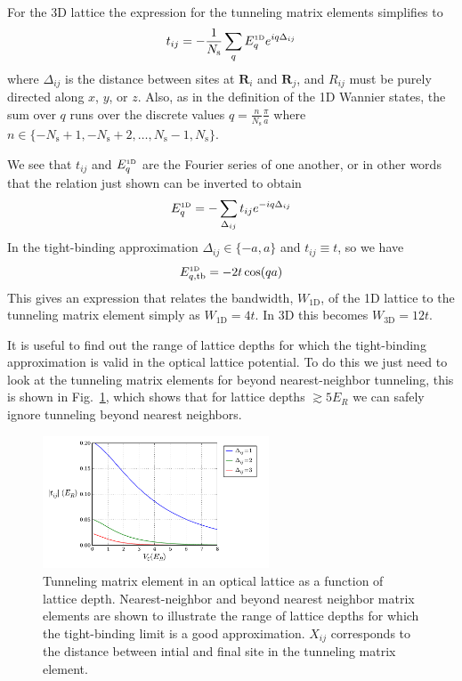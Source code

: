\documentclass[11pt,letter]{article}
\newcommand{\bv}[1]{\ensuremath{\bm{#1}}}
\begin{document}
For the 3D lattice the expression for the tunneling matrix elements simplifies to 
\begin{equation}
  t_{ij} = -\frac{1}{N_{\mathrm{s}}} \sum_{q} E_{q}^{\text{\tiny 1D}} e^{iq \Delta_{ij}} 
\end{equation}
where $\Delta_{ij}$ is the distance between sites at $\bv{R}_{i}$ and $\bv{R}_{j}$, and $R_{ij}$ must be purely directed along $x$, $y$, or $z$.  Also, as in the definition of the 1D Wannier states, the sum over $q$ runs over the discrete
values $q = \frac{n}{N_{\mathrm{s}}} \frac{\pi}{a}$ where 
$ n \in \lbrace
-N_{\mathrm{s}}+1, -N_{\mathrm{s}}+2, \ldots, N_{\mathrm{s}}-1,  N_{\mathrm{s}}  \rbrace$.

We see that $t_{ij}$ and $E_{q}^{\text{\tiny 1D}}$ are the Fourier series of one another, or in other words that the relation just shown can be inverted to obtain
\begin{equation} 
  E_{q}^{\text{\tiny 1D}} = - \sum_{\Delta_{ij}} t_{ij} e^{-iq \Delta_{ij}} 
\end{equation}
In the tight-binding approximation $\Delta_{ij} \in \lbrace -a, a \rbrace$ and $t_{ij}\equiv t$, so we have
\begin{equation}
  E_{q,\text{tb}}^{\text{\tiny 1D}} = -2 t\cos( qa) 
\end{equation}
This gives an expression that relates the bandwidth, $W_{\text{1D}}$, of the 1D lattice to
the tunneling matrix element simply as $W_{\text{1D}}=4t$.  In 3D this becomes
$W_{\text{3D}}= 12t$.

It is useful to find out the range of lattice depths for which the
tight-binding approximation is valid in the optical lattice potential.  To do
this we just need to look at the tunneling matrix elements for beyond
nearest-neighbor tunneling,  this is shown in Fig.~\ref{fig:tightbinding},
which shows that for lattice depths $\gtrsim 5 E_{R}$  we can safely ignore
tunneling beyond nearest neighbors.  
\begin{figure}
\centering \includegraphics[width=0.6\textwidth]{../BandStructure_figures/tightbinding_V0_interp.pdf}
\caption[Tunneling matrix elements in a 3D lattice.]{\small Tunneling matrix
element in an optical lattice as a function of lattice depth.  Nearest-neighbor
and beyond nearest neighbor matrix elements are shown to illustrate the range
of lattice depths for which the tight-binding limit is a good approximation.
$X_{ij}$ corresponds to the distance between intial and final site in the tunneling matrix element. 
 } \label{fig:tightbinding}
\end{figure}
\end{document}
